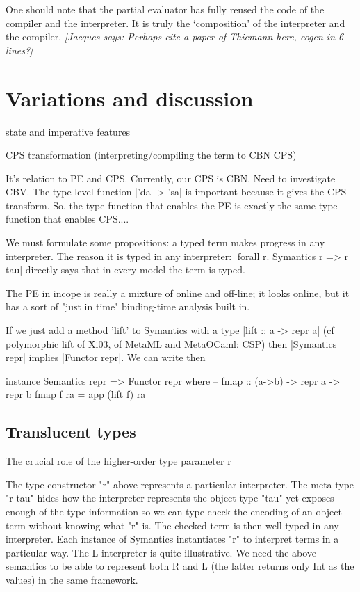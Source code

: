\documentclass[preprint]{sigplanconf}
\newcommand{\jacques}[1]{{\it [Jacques says: #1]}}
\begin{document}
One should note that the partial evaluator has fully reused the code
of the compiler and the interpreter. It is truly the `composition' of the
interpreter and the compiler.  \jacques{Perhaps cite a paper of Thiemann
here, cogen in 6 lines?}




\section{Variations and discussion}\label{discussion}

state and imperative features

CPS transformation (interpreting/compiling the term to CBN CPS)

It's relation to PE and CPS. Currently, our CPS is CBN. Need to
investigate CBV.
The type-level function |'da -> 'sa| is important because it gives 
the CPS transform. So, the type-function
that enables the PE is exactly the same type function that enables
CPS....


We must formulate some propositions: a typed term makes progress in
any interpreter. The reason it is typed in any interpreter:
|forall r. Symantics r => r tau| directly says that in every model the
term is typed. 

The PE in incope is really a mixture of online and off-line; it looks 
online, but it has a sort of "just in time" binding-time analysis built in.

If we just add a method 'lift' to Symantics with a type
|lift :: a -> repr a| (cf polymorphic lift of Xi03, of MetaML and
MetaOCaml: CSP)
then |Symantics repr| implies |Functor repr|. We can write then
\begin{code}
  instance Semantics repr => Functor repr where
  -- fmap :: (a->b) -> repr a -> repr b
  fmap f ra = app (lift f) ra
\end{code}

\subsection{Translucent types}
The crucial role of the higher-order type parameter r

The type constructor "r" above represents a particular interpreter.  The
meta-type "r tau" hides how the interpreter represents the object type
"tau" yet exposes enough of the type information so we can type-check
the encoding of an object term without knowing what "r" is.  The checked
term is then well-typed in any interpreter.  Each instance of Symantics
instantiates "r" to interpret terms in a particular way. The L
interpreter is quite illustrative. We need the above semantics to be
able to represent both R and L (the latter returns only Int as the
values) in the same framework.
\end{document}
